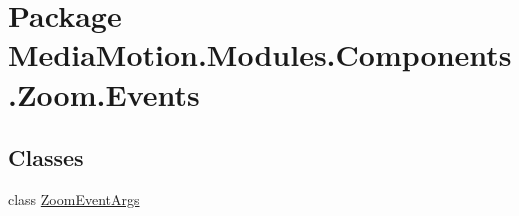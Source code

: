 \hypertarget{namespace_media_motion_1_1_modules_1_1_components_1_1_zoom_1_1_events}{\section{Package Media\+Motion.\+Modules.\+Components.\+Zoom.\+Events}
\label{namespace_media_motion_1_1_modules_1_1_components_1_1_zoom_1_1_events}
}
\subsection*{Classes}
\begin{DoxyCompactItemize}
\item 
class \hyperlink{class_media_motion_1_1_modules_1_1_components_1_1_zoom_1_1_events_1_1_zoom_event_args}{Zoom\+Event\+Args}
\end{DoxyCompactItemize}
